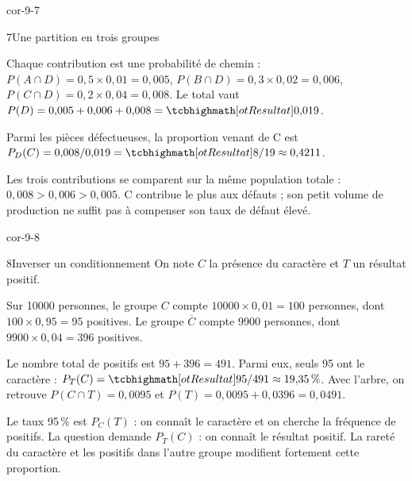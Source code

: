 \begin{blocLivre}{cor-9-7}
\begin{corrige}{7}{Une partition en trois groupes}
\begin{questions}
\item Chaque contribution est une probabilité de chemin :
$P(A\cap D)=0{,}5\times0{,}01=0{,}005$,
$P(B\cap D)=0{,}3\times0{,}02=0{,}006$,
$P(C\cap D)=0{,}2\times0{,}04=0{,}008$.
Le total vaut $P(D)=0{,}005+0{,}006+0{,}008=\res{0{,}019}$.
\item Parmi les pièces défectueuses, la proportion venant de C est
$P_D(C)=0{,}008/0{,}019=\res{8/19\approx0{,}4211}$.
\item Les trois contributions se comparent sur la même population totale :
$0{,}008>0{,}006>0{,}005$. C contribue le plus aux défauts ; son petit volume de production ne suffit pas à compenser son taux de défaut élevé.
\end{questions}

\label{figlivre-r09-07-cor}

\end{corrige}
\end{blocLivre}
\begin{blocLivre}{cor-9-8}
\begin{corrige}{8}{Inverser un conditionnement}
On note $C$ la présence du caractère et $T$ un résultat positif.
\begin{questions}
\item Sur 10000 personnes, le groupe $C$ compte $10000\times0{,}01=100$ personnes,
dont $100\times0{,}95=95$ positives.
Le groupe $\overline C$ compte 9900 personnes, dont $9900\times0{,}04=396$ positives.
\item Le nombre total de positifs est $95+396=491$.
Parmi eux, seuls 95 ont le caractère : $P_T(C)=\res{95/491\approx19{,}35\,\%}$.
Avec l’arbre, on retrouve $P(C\cap T)=0{,}0095$ et $P(T)=0{,}0095+0{,}0396=0{,}0491$.
\item Le taux 95\,\% est $P_C(T)$ : on connaît le caractère et on cherche la fréquence de positifs.
La question demande $P_T(C)$ : on connaît le résultat positif.
La rareté du caractère et les positifs dans l’autre groupe modifient fortement cette proportion.
\end{questions}

\label{figlivre-r09-08-cor}

\end{corrige}
\end{blocLivre}
